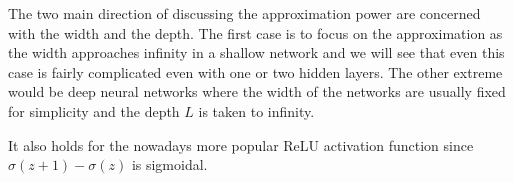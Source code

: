 The two main direction of discussing the approximation power are concerned with
the width and the depth. The first case is to focus on the approximation as the
width approaches infinity in a shallow network and we will see that even this
case is fairly complicated even with one or two hidden layers. The other extreme
would be deep neural networks where the width of the networks are usually fixed
for simplicity and the depth $L$ is taken to infinity. 



It also holds for the nowadays more popular ReLU activation function since
$\sigma(z+1) - \sigma(z)$ is sigmoidal.
